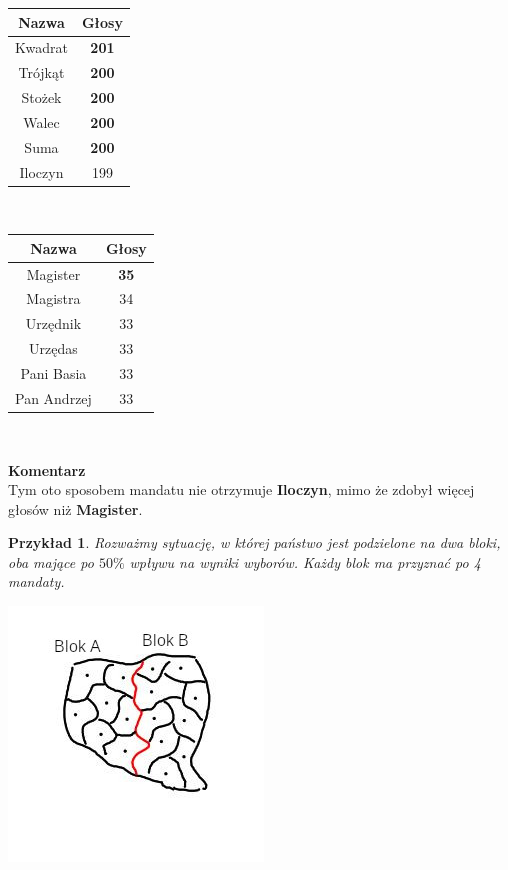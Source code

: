 \documentclass[12pt,a4paper]{article}
\theoremstyle{break}
\newcommand{\Komentarz}[1]{
	\begin{mdframed}[style=zadanie]
		\textbf{Komentarz}\\
		#1
	\end{mdframed}
	}
\newtheorem{example}{Przykład}[section]
\begin{document}
\begin{tabular}{|c|c|}\hline
	Nazwa   & Głosy\\\hline
	Kwadrat & \textbf{201}\\\hline
	Trójkąt & \textbf{200}\\\hline
	Stożek  & \textbf{200}\\\hline
	Walec   & \textbf{200}\\\hline
	Suma    & \textbf{200}\\\hline
	Iloczyn & 199\\\hline
\end{tabular} $\qquad\qquad\qquad\qquad\qquad$
\begin{tabular}{|c|c|}\hline
	Nazwa        & Głosy\\\hline
	Magister     & \textbf{35}\\\hline
	Magistra     & 34\\\hline
	Urzędnik     & 33\\\hline
	Urzędas      & 33\\\hline
	Pani Basia   & 33\\\hline
	Pan Andrzej  & 33\\\hline
\end{tabular}\\

\Komentarz{Tym oto sposobem mandatu nie otrzymuje \textbf{Iloczyn}, mimo że zdobył więcej głosów niż \textbf{Magister}.}

\begin{example}
	Rozważmy sytuację, w której państwo jest podzielone na dwa bloki, oba mające po $50\%$ wpływu na wyniki wyborów. Każdy blok ma przyznać po 4 mandaty.
\end{example}

\begin{center}
	\includegraphics{5050.jpg}
\end{center}
\end{document}
